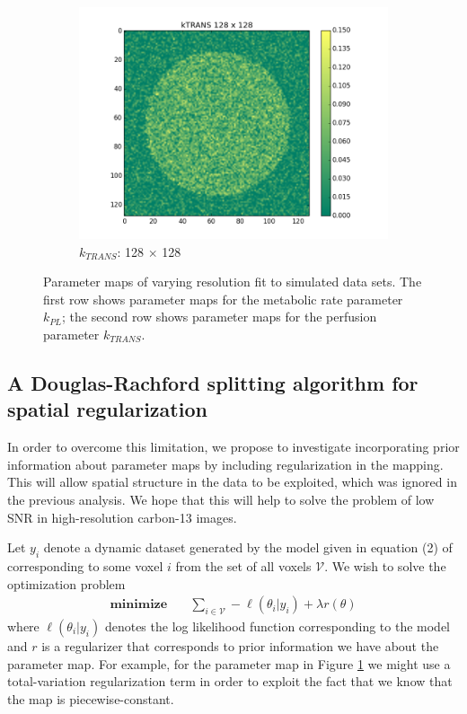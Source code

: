 \documentclass{article}
\begin{document}
\begin{figure}[ht!]
    \begin{subfigure}[b]{0.25\textwidth}
        \includegraphics[width=\textwidth]{figs/kTRANS_128.png}
        \caption{$k_{TRANS}$: 128 $\times$ 128}
    \end{subfigure}
    \caption{Parameter maps of varying resolution fit to simulated data sets. The first row shows parameter maps for the metabolic rate parameter $k_{PL}$; the second row shows parameter maps for the perfusion parameter $k_{TRANS}$. }\label{fig:effect_of_resolution}
\end{figure}

\subsection{A Douglas-Rachford splitting algorithm for spatial regularization} 
In order to overcome this limitation, we propose to investigate incorporating prior information about parameter maps by including regularization in the mapping. This will allow spatial structure in the data to be exploited, which was ignored in the previous analysis. We hope that this will help to solve the problem of low SNR in high-resolution carbon-13 images. 

Let $y_i$ denote a dynamic dataset generated by the model given in equation (2) of \cite{Maidens16} corresponding to some voxel $i$ from the set of all voxels $\mathcal{V}$. We wish to solve the optimization problem  
\begin{equation}
\begin{split}
\textbf{minimize} & \quad  \sum_{i \in \mathcal{V}} -\ell(\theta_i | y_i) + \lambda r(\theta) 
\end{split} 
\label{eq:opt}
\end{equation} 
where $\ell(\theta_i | y_i)$ denotes the log likelihood function corresponding to the model and $r$ is a regularizer that corresponds to prior information we have about the parameter map. For example, for the parameter map in Figure \ref{fig:effect_of_resolution} we might use a total-variation regularization term in order to exploit the fact that we know that the map is piecewise-constant. 
\end{document}
